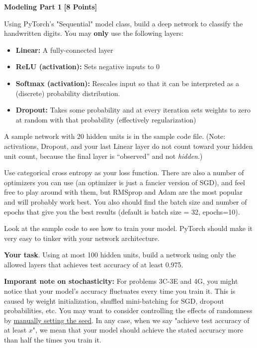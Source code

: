  \problem \textbf{Modeling Part 1} \textbf{[8 Points]}

 Using PyTorch's "Sequential" model class, build a deep network to classify the handwritten digits. You may \textbf{only} use the following layers:

 \begin{itemize}
  \item \textbf{Linear:} A fully-connected layer
  \item \textbf{ReLU (activation):} Sets negative inputs to 0
  \item \textbf{Softmax (activation):} Rescales input so that it can be interpreted as a (discrete) probability distribution.
  \item \textbf{Dropout:} Takes some probability and at every iteration sets weights to zero at random with that probability (effectively regularization)
\end{itemize}

A sample network with 20 hidden units is in the sample code file. (Note: activations, Dropout, and your last Linear layer do not count toward your hidden unit count, because the final layer is ``observed'' and not \emph{hidden}.)

Use categorical cross entropy as your loss function. There are also a number of optimizers  you can use (an optimizer is just a fancier version of SGD), and feel free to play around with them, but RMSprop and Adam are the most popular and will probably work best. You also should find the batch size and number of epochs that give you the best results (default is batch size = 32, epochs=10).

Look at the sample code to see how to train your model. PyTorch should make it very easy to tinker with your network architecture.

\textbf{Your task}. Using at most 100 hidden units, build a network using only the allowed layers that achieves test accuracy of at least 0.975.

\textbf{Imporant note on stochasticity: } For problems 3C-3E and 4G, you might notice that your model's accuracy fluctuates every time you train it. This is caused by weight initialization, shuffled mini-batching for SGD, dropout probabilities, etc. You may want to consider controlling the effects of randomness by \href{https://pytorch.org/docs/stable/generated/torch.manual_seed.html}{manually setting the seed}. In any case, when we say "achieve test accuracy of at least $x$", we mean that your model should achieve the stated accuracy more than half the times you train it.

